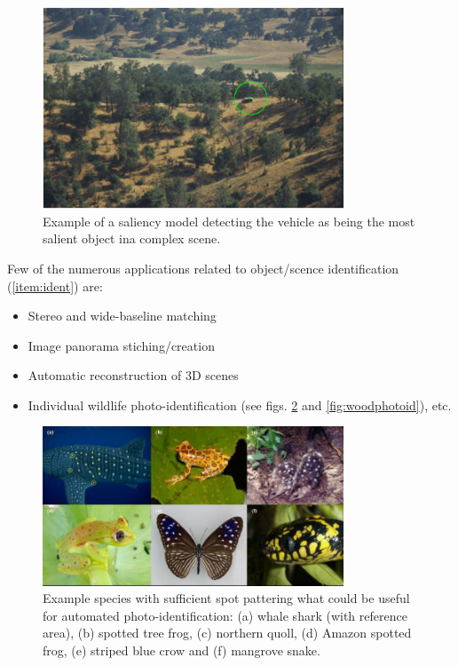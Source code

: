 \begin{figure}[H]
\begin{center}
\includegraphics[width=0.8\textwidth]{fig/saliency}
\end{center}
\caption{Example of a saliency model detecting the vehicle as being the most salient object ina complex scene.}
\label{fig:sal}
\end{figure}

Few of the numerous applications related to object/scence identification (\ref{item:ident}) are:
\begin{itemize}
\item Stereo and wide-baseline matching
\item Image panorama stiching/creation
\item Automatic reconstruction of 3D scenes
\item Individual wildlife photo-identification (see figs.  \ref{fig:photoid} and \ref{fig:woodphotoid}), etc.
\end{itemize}

\begin{figure}[H]
\begin{center}
\includegraphics[width=0.8\textwidth]{fig/photoid}
\end{center}
\caption{Example species with sufficient spot pattering what could be useful for automated photo-identification: (a) whale shark (with reference area),
(b) spotted  tree frog, (c) northern quoll, (d) Amazon spotted frog, (e) striped blue crow and (f) mangrove snake.}
\label{fig:photoid}
\end{figure}

